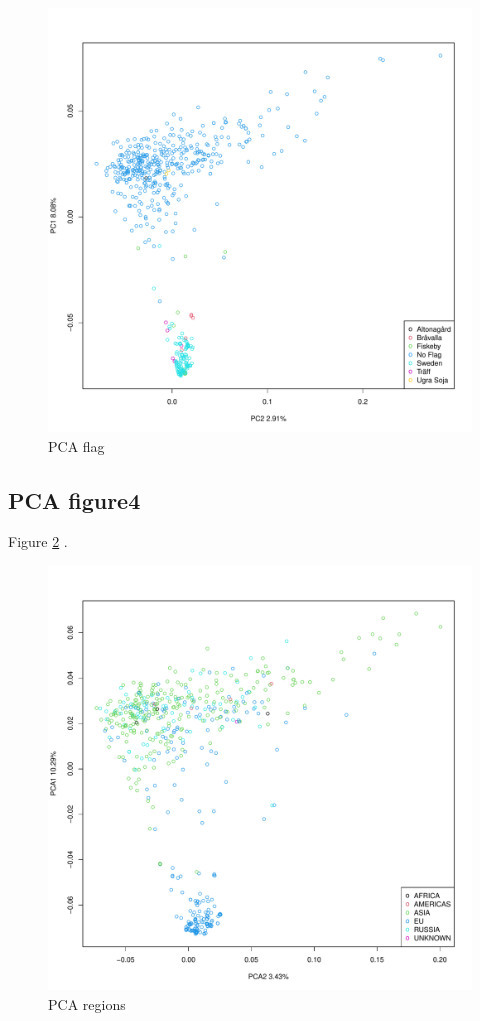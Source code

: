 \documentclass[9pt, twocolumn,twoside]{gsajnl}
\begin{document}
\begin{figure}[t]
\centering
\includegraphics[width=\linewidth]{plot_PCA_flag.pdf}
\caption{PCA flag}
\label{fig:pca3}
\end{figure}



\subsection{PCA figure4}


Figure \ref{fig:pca4} .

\begin{figure}[t]
\centering
\includegraphics[width=\linewidth]{plot_PCA_region2.pdf}
\caption{PCA regions}
\label{fig:pca4}
\end{figure}
\end{document}
